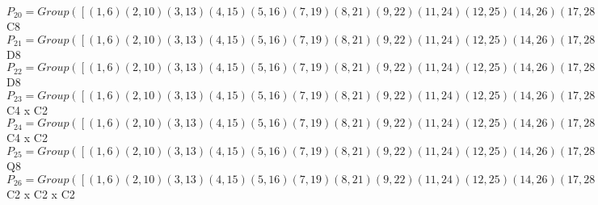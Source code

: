\documentclass[varwidth=\maxdimen,border=10]{standalone}
\begin{document}
\begin{tabular}
$P_{20} = Group( [ ( 1, 6)( 2,10)( 3,13)( 4,15)( 5,16)( 7,19)( 8,21)( 9,22)(11,24)(12,25)(14,26)(17,28)(18,29)(20,30)(23,31)(27,32), ( 1, 5, 6,16)( 2, 9,10,22)( 3,12,13,25)( 4,14,15,26)( 7,18,19,29)( 8,20,21,30)(11,23,24,31)(17,27,28,32), ( 1,27,16,17, 6,32, 5,28)( 2,31,22,24,10,23, 9,11)( 3, 8,25,30,13,21,12,20)( 4,18,26, 7,15,29,14,19) ] )\cong$ C8\ \\
$P_{21} = Group( [ ( 1, 6)( 2,10)( 3,13)( 4,15)( 5,16)( 7,19)( 8,21)( 9,22)(11,24)(12,25)(14,26)(17,28)(18,29)(20,30)(23,31)(27,32), ( 1,14, 6,26)( 2,20,10,30)( 3,23,13,31)( 4, 5,15,16)( 7,27,19,32)( 8, 9,21,22)(11,12,24,25)(17,18,28,29), ( 1, 3)( 2, 7)( 4,11)( 5,25)( 6,13)( 8,17)( 9,29)(10,19)(12,16)(14,31)(15,24)(18,22)(20,32)(21,28)(23,26)(27,30) ] )\cong$ D8\ \\
$P_{22} = Group( [ ( 1, 6)( 2,10)( 3,13)( 4,15)( 5,16)( 7,19)( 8,21)( 9,22)(11,24)(12,25)(14,26)(17,28)(18,29)(20,30)(23,31)(27,32), ( 1, 5, 6,16)( 2, 9,10,22)( 3,12,13,25)( 4,14,15,26)( 7,18,19,29)( 8,20,21,30)(11,23,24,31)(17,27,28,32), ( 1, 3)( 2, 7)( 4,11)( 5,25)( 6,13)( 8,17)( 9,29)(10,19)(12,16)(14,31)(15,24)(18,22)(20,32)(21,28)(23,26)(27,30) ] )\cong$ D8\ \\
$P_{23} = Group( [ ( 1, 6)( 2,10)( 3,13)( 4,15)( 5,16)( 7,19)( 8,21)( 9,22)(11,24)(12,25)(14,26)(17,28)(18,29)(20,30)(23,31)(27,32), ( 1, 5, 6,16)( 2, 9,10,22)( 3,12,13,25)( 4,14,15,26)( 7,18,19,29)( 8,20,21,30)(11,23,24,31)(17,27,28,32), ( 1, 4)( 2, 8)( 3,11)( 5,14)( 6,15)( 7,17)( 9,20)(10,21)(12,23)(13,24)(16,26)(18,27)(19,28)(22,30)(25,31)(29,32) ] )\cong$ C4 x C2\ \\
$P_{24} = Group( [ ( 1, 6)( 2,10)( 3,13)( 4,15)( 5,16)( 7,19)( 8,21)( 9,22)(11,24)(12,25)(14,26)(17,28)(18,29)(20,30)(23,31)(27,32), ( 1, 4)( 2, 8)( 3,11)( 5,14)( 6,15)( 7,17)( 9,20)(10,21)(12,23)(13,24)(16,26)(18,27)(19,28)(22,30)(25,31)(29,32), ( 1, 2, 6,10)( 3,18,13,29)( 4, 8,15,21)( 5,22,16, 9)( 7,25,19,12)(11,27,24,32)(14,30,26,20)(17,31,28,23) ] )\cong$ C4 x C2\ \\
$P_{25} = Group( [ ( 1, 6)( 2,10)( 3,13)( 4,15)( 5,16)( 7,19)( 8,21)( 9,22)(11,24)(12,25)(14,26)(17,28)(18,29)(20,30)(23,31)(27,32), ( 1,14, 6,26)( 2,20,10,30)( 3,23,13,31)( 4, 5,15,16)( 7,27,19,32)( 8, 9,21,22)(11,12,24,25)(17,18,28,29), ( 1, 2, 6,10)( 3,18,13,29)( 4, 8,15,21)( 5,22,16, 9)( 7,25,19,12)(11,27,24,32)(14,30,26,20)(17,31,28,23) ] )\cong$ Q8\ \\
$P_{26} = Group( [ ( 1, 6)( 2,10)( 3,13)( 4,15)( 5,16)( 7,19)( 8,21)( 9,22)(11,24)(12,25)(14,26)(17,28)(18,29)(20,30)(23,31)(27,32), ( 1, 4)( 2, 8)( 3,11)( 5,14)( 6,15)( 7,17)( 9,20)(10,21)(12,23)(13,24)(16,26)(18,27)(19,28)(22,30)(25,31)(29,32), ( 1, 3)( 2, 7)( 4,11)( 5,25)( 6,13)( 8,17)( 9,29)(10,19)(12,16)(14,31)(15,24)(18,22)(20,32)(21,28)(23,26)(27,30) ] )\cong$ C2 x C2 x C2\ \\

\end{tabular}
\end{document}
